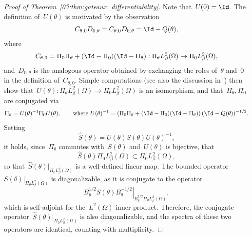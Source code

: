 \begin{proof}[Proof of Theorem~\ref{03:thm:gateaux_differentiability}]
    Note that~$U(0)=\Id$. The definition of~$U(\theta)$ is motivated by the observation
    \begin{equation}
        C_{\theta,0}D_{0,\theta} = C_{\theta,0}D_{0,\theta} = \Id-Q(\theta),
    \end{equation}
    where
    $$C_{\theta,0} = \Pi_0\Pi_\theta + (\Id-\Pi_0)(\Id-\Pi_\theta):\Pi_\theta L^2_\beta(\Omega)\to \Pi_0 L^2_\beta(\Omega),$$
    and~$D_{0,\theta}$ is the analogous operator obtained by exchanging the roles of~$\theta$ and~$0$ in the definition of~$C_{\theta,0}$.
    Simple computations (see also the discussion in~\cite[Section I.4.6]{K95}) then show that~$U(\theta):\Pi_\theta L_\beta^2(\Omega)\to\Pi_0 L^2_\beta(\Omega)$ is an isomorphism,
    and that~$\Pi_\theta,\Pi_0$ are conjugated via
    \begin{equation}
        \label{03:eq:derivative_conjugation}
        \Pi_\theta = U(\theta)^{-1}\Pi_0 U(\theta),\qquad\text{where }U(\theta)^{-1} = \left(\Pi_0\Pi_\theta+(\Id-\Pi_0)(\Id-\Pi_\theta)\right)(\Id-Q(\theta))^{-1/2}.
    \end{equation}
    Setting
    \begin{equation}
        \label{03:eq:conjugation}
        \widehat{S}(\theta)=U(\theta) S(\theta)U(\theta)^{-1},
    \end{equation}
    it holds, since~$\Pi_\theta$ commutes with~$S(\theta)$ and~$U(\theta)$ is bijective, that
    \begin{equation}
        \widehat S(\theta){\Pi_0 L^2_\beta(\Omega)} \subset {\Pi_0 L^2_\beta(\Omega)},
    \end{equation}
    so that~$\widehat S(\theta)|_{{\Pi_0 L^2_\beta(\Omega)}}$ is a well-defined linear map. The bounded operator~$S(\theta)|_{{\Pi_\theta L^2_\beta(\Omega)}}$ is diagonalizable, as it is conjugate to the operator
    $$\left.B_\theta^{1/2}S(\theta)B_\theta^{-1/2}\right|_{B_\theta^{1/2}{\Pi_\theta L^2_\beta(\Omega)}},$$
    which is self-adjoint for the~$L^2(\Omega)$ inner product. Therefore, the conjugate operator~$\widehat S(\theta)|_{{\Pi_0 L^2_\beta(\Omega)}}$ is also diagonalizable, and the spectra of these two operators are identical, counting with multiplicity.


\end{proof}
